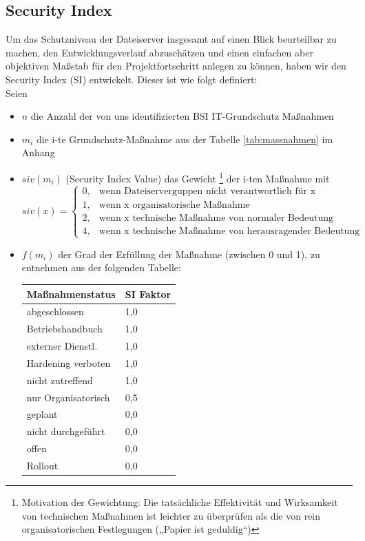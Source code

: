 \subsection{Security Index}
\label{subsec:si}
Um das Schutzniveau der Dateiserver insgesamt auf einen Blick beurteilbar zu machen, den Entwicklungsverlauf abzuschätzen und einen einfachen aber objektiven Maßstab für den Projektfortschritt anlegen zu können, haben wir den Security Index (SI) entwickelt. Dieser ist wie folgt definiert:\\

Seien
\begin{itemize}
\item $n$ die Anzahl der von uns identifizierten BSI IT-Grundschutz Maßnahmen
\item $m_i$ die i-te Grundschutz-Maßnahme aus der Tabelle \ref{tab:massnahmen} im Anhang
\item $siv(m_i)$ (Security Index Value) das Gewicht \footnote{Motivation der Gewichtung: Die tatsächliche Effektivität und Wirksamkeit von technischen Maßnahmen ist leichter zu überprüfen als die von rein organisatorischen Festlegungen („Papier ist geduldig“)} der i-ten Maßnahme mit
\begin{equation}
siv(x)= 
\begin{cases}
    0,& \text{wenn Dateiserverguppen nicht verantwortlich für x }\\
    1,& \text{wenn x organisatorische Maßnahme}\\
    2,& \text{wenn x technische Maßnahme von normaler Bedeutung}\\
    4,& \text{wenn x technische Maßnahme von herausragender Bedeutung}
\end{cases}
\end{equation}
\item $f(m_i)$ der Grad der Erfüllung der Maßnahme (zwischen 0 und 1), zu entnehmen aus der folgenden Tabelle: \\

\begin{minipage}{\textwidth}
\begin{center}
\begin{tabular}{ll}
\toprule
Maßnahmenstatus & SI Faktor \\
\midrule
abgeschlossen & 1,0 \\
Betriebshandbuch & 1,0 \\
externer Dienstl. & 1,0 \\
Hardening verboten & 1,0 \\
nicht zutreffend & 1,0 \\
nur Organisatorisch & 0,5 \\
geplant & 0,0 \\
nicht durchgeführt & 0,0 \\
offen & 0,0 \\
Rollout & 0,0  \\
\bottomrule
\end{tabular}
\end{center}
\end{minipage}
\end{itemize}
\bigskip

